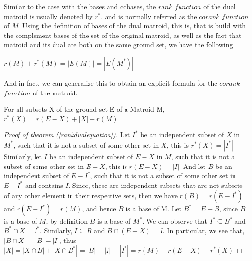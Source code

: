 Similar to the case with the bases and cobases, the $rank$ $ function$ of the dual matroid is usually denoted by $r^*$, and is normally referred as the $corank$ $function$ of $M$. Using the definition of bases of the dual matroid, this is, that is build with the complement bases of the set of the original matroid, as well as the fact that matroid and its dual are both on the same ground set, we have the following

\begin{theorem}\label{RankAndCorankEquation}
    $r(M) + r^*(M) = |E(M)|=|E(M^*)|$
\end{theorem}

And in fact, we can generalize this to obtain an explicit formula for the $corank$ $function$ of the matroid. 

\begin{theorem}\label{rankdualequation}
    For all subsets X of the ground set E of a Matroid M,\\
    $r^*(X)=r(E-X)+|X|-r(M)$
\end{theorem}

\begin{proof}[Proof of theorem (\ref{rankdualequation})]
    Let $I^*$ be an independent subset of $X$ in $M^*$, such that it is not a subset of some other set in $X$, this is $r^*(X)=|I^*|$. Similarly, let $I$ be an independent subset of $E-X$ in $M$, such that it is not a subset of some other set in $E-X$, this is $r(E-X)=|I|$. And let $B$ be an independent subset of $E-I^*$, such that it is not a subset of some other set in $E-I^*$ and contains $I$. Since, these are independent subsets that are not subsets of any other element in their respective sets, then we have $r(B)=r(E-I^*)$ and $r(E-I^*)=r(M)$, and hence $B$ is a base of M.
    Let $B^*=E-B$, since $B$ is a base of $M$, by definition $B$ is a base of $M^*$. We can observe that $I^*\subseteq B^*$ and  $B^*\cap X=I^*$. Similarly, $I\subseteq B$ and  $B\cap (E-X)=I$. In particular, we see that, $|B\cap X|=|B|-|I|$, thus
    $|X|=|X\cap B|+|X\cap B^*|=|B|-|I|+|I^*|=r(M)-r(E-X)+r^*(X)$
\end{proof}


